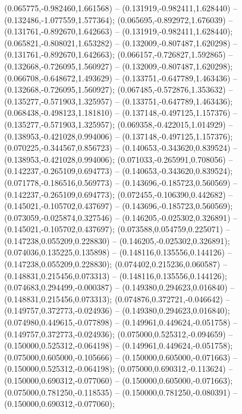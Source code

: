  (0.065775,-0.982460,1.661568) -- (0.131919,-0.982411,1.628440) -- (0.132486,-1.077559,1.577364);
 (0.065695,-0.892972,1.676039) -- (0.131761,-0.892670,1.642663) -- (0.131919,-0.982411,1.628440);
 (0.065821,-0.808021,1.653282) -- (0.132009,-0.807487,1.620298) -- (0.131761,-0.892670,1.642663);
 (0.066157,-0.726827,1.592865) -- (0.132668,-0.726095,1.560927) -- (0.132009,-0.807487,1.620298);
 (0.066708,-0.648672,1.493629) -- (0.133751,-0.647789,1.463436) -- (0.132668,-0.726095,1.560927);
 (0.067485,-0.572876,1.353632) -- (0.135277,-0.571903,1.325957) -- (0.133751,-0.647789,1.463436);
 (0.068438,-0.498123,1.181810) -- (0.137148,-0.497125,1.157376) -- (0.135277,-0.571903,1.325957);
 (0.069358,-0.422015,1.014929) -- (0.138953,-0.421028,0.994006) -- (0.137148,-0.497125,1.157376);
 (0.070225,-0.344567,0.856723) -- (0.140653,-0.343620,0.839524) -- (0.138953,-0.421028,0.994006);
 (0.071033,-0.265991,0.708056) -- (0.142237,-0.265109,0.694773) -- (0.140653,-0.343620,0.839524);
 (0.071778,-0.186516,0.569773) -- (0.143696,-0.185723,0.560569) -- (0.142237,-0.265109,0.694773);
 (0.072455,-0.106390,0.442682) -- (0.145021,-0.105702,0.437697) -- (0.143696,-0.185723,0.560569);
 (0.073059,-0.025874,0.327546) -- (0.146205,-0.025302,0.326891) -- (0.145021,-0.105702,0.437697);
 (0.073588,0.054759,0.225071) -- (0.147238,0.055209,0.228830) -- (0.146205,-0.025302,0.326891);
 (0.074036,0.135225,0.135898) -- (0.148116,0.135556,0.144126) -- (0.147238,0.055209,0.228830);
 (0.074402,0.215236,0.060587) -- (0.148831,0.215456,0.073313) -- (0.148116,0.135556,0.144126);
 (0.074683,0.294499,-0.000387) -- (0.149380,0.294623,0.016840) -- (0.148831,0.215456,0.073313);
 (0.074876,0.372721,-0.046642) -- (0.149757,0.372773,-0.024936) -- (0.149380,0.294623,0.016840);
 (0.074980,0.449615,-0.077898) -- (0.149961,0.449624,-0.051758) -- (0.149757,0.372773,-0.024936);
 (0.075000,0.525312,-0.094659) -- (0.150000,0.525312,-0.064198) -- (0.149961,0.449624,-0.051758);
 (0.075000,0.605000,-0.105666) -- (0.150000,0.605000,-0.071663) -- (0.150000,0.525312,-0.064198);
 (0.075000,0.690312,-0.113624) -- (0.150000,0.690312,-0.077060) -- (0.150000,0.605000,-0.071663);
 (0.075000,0.781250,-0.118535) -- (0.150000,0.781250,-0.080391) -- (0.150000,0.690312,-0.077060);
